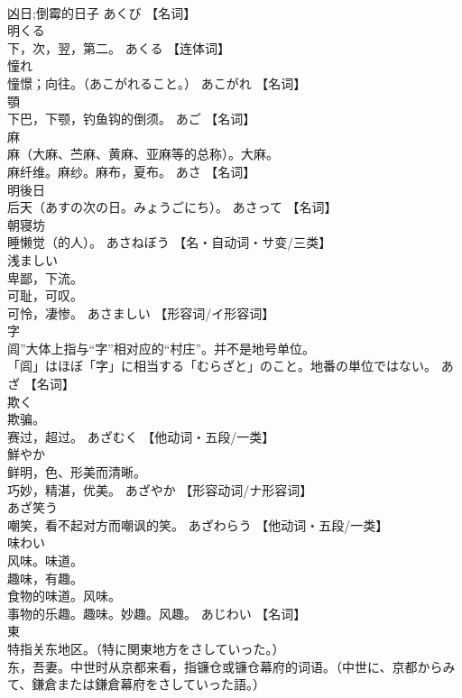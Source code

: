 \documentclass[8pt]{extreport}
\begin{document}
\begin{CJK}{UTF8}{min}
\\	凶日;倒霉的日子	あくび		【名词】
\\	明くる	
\\	下，次，翌，第二。	あくる		【连体词】
\\	憧れ	
\\	憧憬；向往。（あこがれること。）	あこがれ		【名词】
\\	顎	
\\	下巴，下颚，钓鱼钩的倒须。	あご		【名词】
\\	麻	
\\	麻（大麻、苎麻、黄麻、亚麻等的总称）。大麻。 
\\	麻纤维。麻纱。麻布，夏布。	あさ		【名词】
\\	明後日	
\\	后天（あすの次の日。みょうごにち）。	あさって		【名词】
\\	朝寝坊	
\\	睡懒觉（的人）。	あさねぼう		【名・自动词・サ变/三类】
\\	浅ましい	
\\	卑鄙，下流。 
\\	可耻，可叹。 
\\	可怜，凄惨。	あさましい		【形容词/イ形容词】
\\	字	
\\	闾”大体上指与“字”相对应的“村庄”。并不是地号单位。 
\\	「闾」はほぼ「字」に相当する「むらざと」のこと。地番の単位ではない。	あざ		【名词】
\\	欺く	
\\	欺骗。 
\\	赛过，超过。	あざむく		【他动词・五段/一类】
\\	鮮やか	
\\	鲜明，色、形美而清晰。 
\\	巧妙，精湛，优美。	あざやか		【形容动词/ナ形容词】
\\	あざ笑う	
\\	嘲笑，看不起对方而嘲讽的笑。	あざわらう		【他动词・五段/一类】
\\	味わい	
\\	风味。味道。 
\\	趣味，有趣。 
\\	食物的味道。风味。 
\\	事物的乐趣。趣味。妙趣。风趣。	あじわい		【名词】
\\	東	
\\	特指关东地区。（特に関東地方をさしていった。） 
\\	东，吾妻。中世时从京都来看，指镰仓或镰仓幕府的词语。（中世に、京都からみて、鎌倉または鎌倉幕府をさしていった語。） 

\end{CJK}
\end{document}
